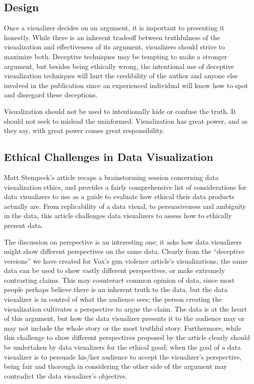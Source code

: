 \documentclass[]{book}
\theoremstyle{definition}
\theoremstyle{definition}
\theoremstyle{definition}
\theoremstyle{remark}
\begin{document}
\subsection{Design}\label{design}

Once a visualizer decides on an argument, it is important to presenting
it honestly. While there is an inherent tradeoff between truthfulness of
the visualization and effectiveness of its argument, visualizers should
strive to maximize both. Deceptive techniques may be tempting to make a
stronger argument, but besides being ethically wrong, the intentional
use of deceptive visualization techniques will hurt the credibility of
the author and anyone else involved in the publication since an
experienced individual will know how to spot and disregard these
deceptions.

Visualization should not be used to intentionally hide or confuse the
truth. It should not seek to mislead the uninformed. Visualization has
great power, and as they say, with great power comes great
responsibility.

\subsection{Ethical Challenges in Data
Visualization}\label{ethical-challenges-in-data-visualization}

Matt Stempeck's article recaps a brainstorming session concerning data
visualization ethics, and provides a fairly comprehensive list of
considerations for data visualizers to use as a guide to evaluate how
ethical their data products actually are. From replicability of a data
visual, to persuasiveness and ambiguity in the data, this article
challenges data visualizers to assess how to ethically present data.

The discussion on perspective is an interesting one; it asks how data
visualizers might show different perspectives on the same data. Clearly
from the ``deceptive versions'' we have created for Vox's gun violence
article's visualizations, the same data can be used to show vastly
different perspectives, or make extremely contrasting claims. This may
counteract common opinion of data, since most people perhaps believe
there is an inherent truth to the data, but the data visualizer is in
control of what the audience sees; the person creating the visualization
cultivates a perspective to argue the claim. The data is at the heart of
this argument, but how the data visualizer presents it to the audience
may or may not include the whole story or the most truthful story.
Furthermore, while this challenge to show different perspectives
proposed by the article clearly should be undertaken by data visualizers
for the ethical good; when the goal of a data visualizer is to persuade
his/her audience to accept the visualizer's perspective, being fair and
thorough in considering the other side of the argument may contradict
the data visualizer's objective.
\end{document}
